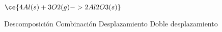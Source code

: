 $\ce{4Al(s) + 3O2(g) -> 2Al2O3(s)}$

\begin{choices}
    \choice Descomposición
    \CorrectChoice Combinación
    \choice Desplazamiento
    \choice Doble desplazamiento
\end{choices}